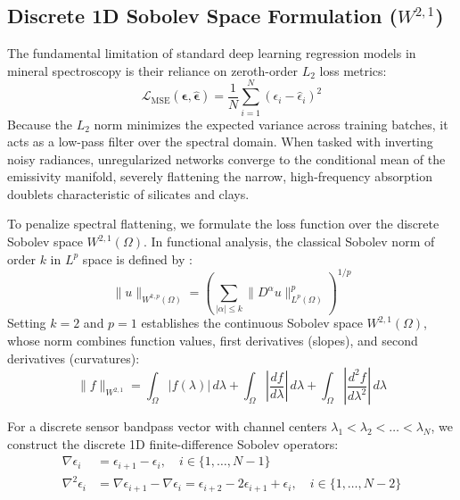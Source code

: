 \documentclass[journal]{IEEEtran}
\begin{document}
\subsection{Discrete 1D Sobolev Space Formulation (\texorpdfstring{$W^{2,1}$}{W(2,1)})}
The fundamental limitation of standard deep learning regression models in mineral spectroscopy is their reliance on zeroth-order $L_2$ loss metrics:
\begin{equation}
\mathcal{L}_{\text{MSE}}(\bm{\epsilon}, \hat{\bm{\epsilon}}) = \frac{1}{N}\sum_{i=1}^N (\epsilon_i - \hat{\epsilon}_i)^2
\label{eq:mse_def}
\end{equation}
Because the $L_2$ norm minimizes the expected variance across training batches, it acts as a low-pass filter over the spectral domain. When tasked with inverting noisy radiances, unregularized networks converge to the conditional mean of the emissivity manifold, severely flattening the narrow, high-frequency absorption doublets characteristic of silicates and clays.

To penalize spectral flattening, we formulate the loss function over the discrete Sobolev space $W^{2,1}(\Omega)$. In functional analysis, the classical Sobolev norm of order $k$ in $L^p$ space is defined by \cite{czarnecki2017sobolev, son2021sobolev}:
\begin{equation}
\|u\|_{W^{k,p}(\Omega)} = \left( \sum_{|\alpha| \le k} \|D^\alpha u\|_{L^p(\Omega)}^p \right)^{1/p}
\end{equation}
Setting $k=2$ and $p=1$ establishes the continuous Sobolev space $W^{2,1}(\Omega)$, whose norm combines function values, first derivatives (slopes), and second derivatives (curvatures):
\begin{equation}
\|f\|_{W^{2,1}} = \int_\Omega |f(\lambda)| \, d\lambda + \int_\Omega \left|\frac{df}{d\lambda}\right| \, d\lambda + \int_\Omega \left|\frac{d^2f}{d\lambda^2}\right| \, d\lambda
\label{eq:continuous_sobolev}
\end{equation}

For a discrete sensor bandpass vector with channel centers $\lambda_1 < \lambda_2 < \dots < \lambda_N$, we construct the discrete 1D finite-difference Sobolev operators:
\begin{align}
\nabla \epsilon_i &= \epsilon_{i+1} - \epsilon_i, \quad i \in \{1, \dots, N-1\} \label{eq:grad_def} \\
\nabla^2 \epsilon_i &= \nabla \epsilon_{i+1} - \nabla \epsilon_i = \epsilon_{i+2} - 2\epsilon_{i+1} + \epsilon_i, \quad i \in \{1, \dots, N-2\} \label{eq:curv_def}
\end{align}
\end{document}
